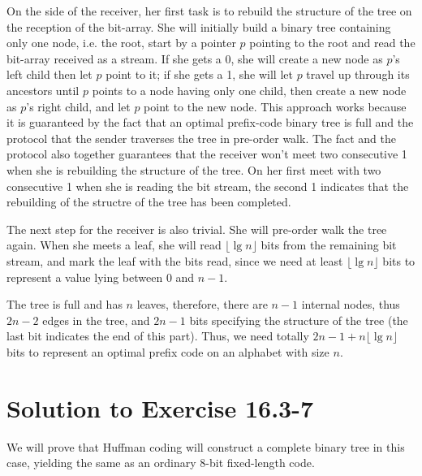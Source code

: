 \documentclass[fleqn]{article}
\begin{document}
On the side of the receiver, her first task is to rebuild the
structure of the tree on the reception of the bit-array. She will
initially build a binary tree containing only one node, i.e. the root,
start by a pointer $p$ pointing to the root and read the bit-array
received as a stream. If she gets a 0, she will create a new node as
$p$'s left child then let $p$ point to it; if she gets a 1, she will
let $p$ travel up through its ancestors until $p$ points to a node
having only one child, then create a new node as $p$'s right child,
and let $p$ point to the new node. This approach works because it is
guaranteed by the fact that an optimal prefix-code binary tree is full
and the protocol that the sender traverses the tree in pre-order walk.
The fact and the protocol also together guarantees that the receiver
won't meet two consecutive 1 when she is rebuilding the structure of
the tree. On her first meet with two consecutive 1 when she is reading
the bit stream, the second 1 indicates that the rebuilding of the
structre of the tree has been completed.

The next step for the receiver is also trivial. She will pre-order
walk the tree again. When she meets a leaf, she will read $\lfloor \lg
n \rfloor$ bits from the remaining bit stream, and mark the leaf with
the bits read, since we need at least $\lfloor \lg n \rfloor$ bits to
represent a value lying between 0 and $n-1$.

The tree is full and has $n$ leaves, therefore, there are $n-1$
internal nodes, thus $2n-2$ edges in the tree, and $2n-1$ bits
specifying the structure of the tree (the last bit indicates the end
of this part). Thus, we need totally $2n - 1 + n \lfloor \lg n
\rfloor$ bits to represent an optimal prefix code on an alphabet with
size $n$.







\section*{Solution to Exercise 16.3-7}

We will prove that Huffman coding will construct a complete binary
tree in this case, yielding the same as an ordinary 8-bit fixed-length
code.
\end{document}
